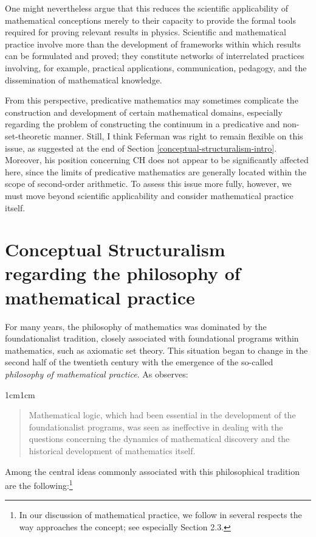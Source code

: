 \documentclass[11pt,a4paper]{article}
\theoremstyle{plain}
\begin{document}
One might nevertheless argue that this reduces the scientific applicability of mathematical conceptions merely to their capacity to provide the formal tools required for proving relevant results in physics. Scientific and mathematical practice involve more than the development of frameworks within which results can be formulated and proved; they constitute networks of interrelated practices involving, for example, practical applications, communication, pedagogy, and the dissemination of mathematical knowledge.

From this perspective, predicative mathematics may sometimes complicate the construction and development of certain mathematical domains, especially regarding the problem of constructing the continuum in a predicative and non-set-theoretic manner. Still, I think Feferman was right to remain flexible on this issue, as suggested at the end of Section \ref{conceptual-structuralism-intro}. Moreover, his position concerning CH does not appear to be significantly affected here, since the limits of predicative mathematics are generally located within the scope of second-order arithmetic. To assess this issue more fully, however, we must move beyond scientific applicability and consider mathematical practice itself.

\section{Conceptual Structuralism regarding the philosophy of mathematical practice}
\label{mathematical-practice}

For many years, the philosophy of mathematics was dominated by the foundationalist tradition, closely associated with foundational programs within mathematics, such as axiomatic set theory. This situation began to change in the second half of the twentieth century with the emergence of the so-called \textit{philosophy of mathematical practice}. As \textcite[4]{Mancosu2008} observes:

\begin{adjustwidth}{1cm}{1cm}
\begin{quote}
\small
Mathematical logic, which had been essential in the development of the foundationalist programs, was seen as ineffective in dealing with the questions concerning the dynamics of mathematical discovery and the historical development of mathematics itself. 
\end{quote}
\end{adjustwidth}

Among the central ideas commonly associated with this philosophical tradition are the following:\footnote{In our discussion of mathematical practice, we follow in several respects the way \textcite{Ferreiros2016} approaches the concept; see especially Section 2.3.}
\end{document}
